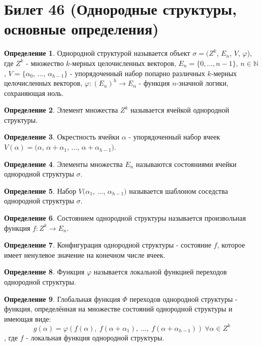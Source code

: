 \documentclass[a4paper, 12pt]{article}
\newcommand{\N}{\mathbb N}
\renewcommand{\phi}{\varphi}
\theoremstyle{definition}
\newtheorem*{definition}{Определение}
\theoremstyle{plain}
\theoremstyle{remark}
\begin{document}
  \section{Билет 46 (Однородные структуры, основные определения)}
  \begin{definition}
    Однородной структурой называется объект $\sigma=(Z^k$, $E_n$, $V$, $\phi$), где $Z^k$ - множество $k$-мерных целочисленных векторов, $E_n=\{0,\ldots,n-1\}$, $n\in\N$, $V=\{\alpha_0$, $\ldots$, $\alpha_{h-1}\}$ - упорядоченный набор попарно различных $k$-мерных целочисленных векторов, $\phi: (E_n)^h\rightarrow E_n$ - функция $n$-значной логики, сохраняющая ноль.
  \end{definition}
  \begin{definition}
    Элемент множества $Z^k$ называется ячейкой однородной структуры.
  \end{definition}
  \begin{definition}
    Окрестность ячейки $\alpha$ - упорядоченный набор ячеек $V(\alpha)=(\alpha$, $\alpha+\alpha_1$, $\ldots$, $\alpha+\alpha_{h-1})$.
  \end{definition}
  \begin{definition}
    Элементы множества $E_n$ называются состояниями ячейки однородной структуры $\sigma$.
  \end{definition}
  \begin{definition}
    Набор $V(\alpha_1$, $\ldots$, $\alpha_{h-1})$ называется шаблоном соседства однородной структуры $\sigma$.
  \end{definition}
  \begin{definition}
    Состоянием однородной структуры называется произвольная функция $f:Z^k\rightarrow E_n$.
  \end{definition}
  \begin{definition}
    Конфигурация однородной структуры - состояние $f$, которое имеет ненулевое значение на конечном числе ячеек.
  \end{definition}
  \begin{definition}
    Функция $\phi$ называется локальной функцией переходов однородной структуры.
  \end{definition}
  \begin{definition}
    Глобальная функция $\Phi$ переходов однородной структуры - функция, определённая на множестве состояний однородной структуры и имеющая виде:\\
    $$g(\alpha)=\phi(f(\alpha), \ f(\alpha+\alpha_1), \ \ldots, \ f(\alpha+\alpha_{h-1})) \ \forall\alpha\in Z^k$$, где $f$ - локальная функция однородной структуры.
  \end{definition}
\end{document}
